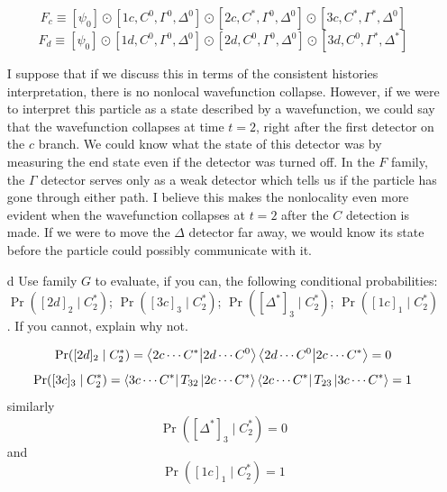 \documentclass[a4paper,twoside]{article}
\begin{document}
\begin{itemize}
        \begin{equation}
            F_c \equiv [\psi_0] \odot [1c,C^0, \Gamma^0, \Delta^0] \odot [2c,C^*, \Gamma^0, \Delta^0] \odot [3c, C^*, \Gamma^*, \Delta^0]
        \end{equation}
        \begin{equation}
            F_d \equiv [\psi_0] \odot [1d,C^0, \Gamma^0, \Delta^0] \odot [2d,C^0, \Gamma^0, \Delta^0] \odot [3d, C^0, \Gamma^*, \Delta^*]
        \end{equation}
        \begin{tcolorbox}[breakable]
            I suppose that if we discuss this in terms of the consistent histories interpretation, there is no nonlocal wavefunction collapse. However, if we were to interpret this particle as a state described by a wavefunction, we could say that the wavefunction collapses at time $ t = 2 $, right after the first detector on the $ c $ branch. We could know what the state of this detector was by measuring the end state even if the detector was turned off. In the $ F $ family, the $ \Gamma $ detector serves only as a weak detector which tells us if the particle has gone through either path. I believe this makes the nonlocality even more evident when the wavefunction collapses at $ t = 2 $ after the $ C $ detection is made. If we were to move the $ \Delta $ detector far away, we would know its state before the particle could possibly communicate with it.
        \end{tcolorbox}
    \item[d] Use family $ G $ to evaluate, if you can, the following conditional probabilities: $ \Pr([2d]_2\mid C_2^*) $; $ \Pr([3c]_3\mid C_2^*) $; $ \Pr([ \Delta^* ]_3\mid C_2^*) $; $ \Pr([1c]_1\mid C_2^*) $. If you cannot, explain why not.
        \begin{tcolorbox}[breakable]
            \begin{equation}
                \Pr([2d]_2\mid C_2^*) = \bra{2c\cdots C^*} \ket{2d \cdots C^0} \bra{2d \cdots C^0} \ket{2c\cdots C^*} = 0
            \end{equation}
            \begin{equation}
                \Pr([3c]_3\mid C_2^*) = \bra{3c\cdots C^*}T_{32} \ket{2c\cdots C^*} \bra{2c\cdots C^*} T_{23} \ket{3c\cdots C^*} = 1
            \end{equation}
            similarly
            \begin{equation}
                \Pr([ \Delta^* ]_3\mid C_2^*) = 0
            \end{equation}
            and
            \begin{equation}
                \Pr([1c]_1\mid C_2^*) = 1
            \end{equation}
        \end{tcolorbox}
\end{itemize}
\end{document}
